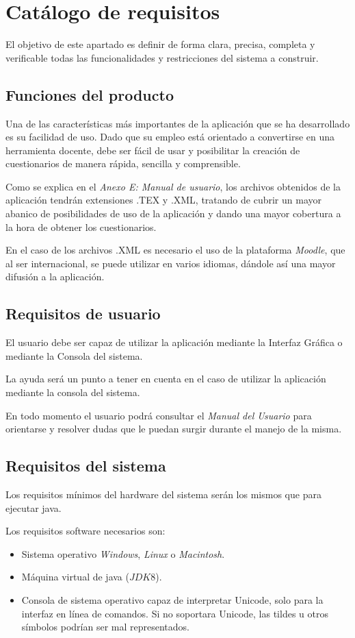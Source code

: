 \section{Catálogo de requisitos}
El objetivo de este apartado es definir de forma clara, precisa, completa y verificable todas las funcionalidades y restricciones del sistema a construir.

\subsection{Funciones del producto}
Una de las características más importantes de la aplicación que se ha  desarrollado es su facilidad de uso. 
Dado que su empleo está orientado a convertirse en una herramienta docente, debe ser fácil de usar y posibilitar la creación de cuestionarios de manera rápida, sencilla y comprensible.

Como se explica en el \textit{Anexo E: Manual de usuario}, los archivos obtenidos de la aplicación tendrán extensiones .TEX y .XML, tratando de cubrir un mayor abanico de posibilidades de uso de la aplicación y dando una mayor cobertura a la hora de obtener los cuestionarios.

En el caso de los archivos .XML es necesario el uso de la plataforma \textit{Moodle}, que al ser internacional, se puede utilizar en varios idiomas, dándole así una mayor difusión a la aplicación.

\subsection{Requisitos de usuario}
El usuario debe ser capaz de utilizar la aplicación mediante la Interfaz Gráfica o mediante la Consola del sistema. 

La ayuda será un punto a tener en cuenta en el caso de utilizar la aplicación mediante la consola del sistema.
 
En todo momento el usuario podrá consultar el \textit{Manual del Usuario} para
orientarse y resolver dudas que le puedan surgir durante el manejo de la misma.

\subsection{Requisitos del sistema}
Los requisitos mínimos del hardware del sistema serán los mismos que para ejecutar java\cite{requisitos}.


Los requisitos software necesarios son:
\begin{itemize}
\item Sistema operativo \textit{Windows}, \textit{Linux} o \textit{Macintosh}.
\item Máquina virtual de java ($JDK 8$).
\item Consola de sistema operativo capaz de interpretar Unicode, solo para la interfaz en línea de comandos. Si no soportara Unicode, las tildes u otros símbolos podrían ser mal representados.
\end{itemize}

